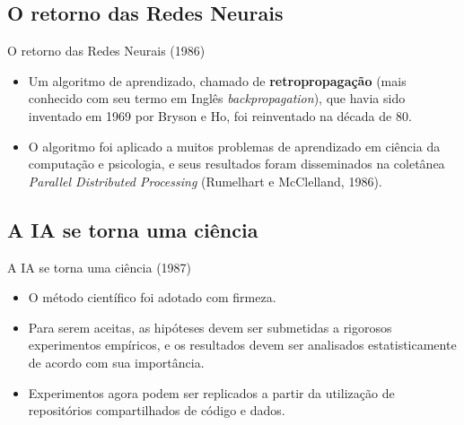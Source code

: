 \documentclass{libs/ufc_format}
\begin{document}
\subsection{O retorno das Redes Neurais}

\begin{frame}{O retorno das Redes Neurais (1986)}
    \begin{itemize}
        \justifying
        \item Um algoritmo de aprendizado, chamado de \textbf{retropropagação} (mais conhecido com seu termo em Inglês \textit{backpropagation}), que havia sido inventado em 1969 por Bryson e Ho, foi reinventado na década de 80.
        \item<2> O algoritmo foi aplicado a muitos problemas de aprendizado em ciência da computação e psicologia, e seus resultados foram disseminados na coletânea \textit{Parallel Distributed Processing} (Rumelhart e McClelland, 1986).
    \end{itemize}
\end{frame}

\subsection{A IA se torna uma ciência}

\begin{frame}{A IA se torna uma ciência (1987)}
    \begin{itemize}
        \justifying
        \item O método científico foi adotado com firmeza.
        \item Para serem aceitas, as hipóteses devem ser submetidas a rigorosos experimentos empíricos, e os resultados devem ser analisados estatisticamente de acordo com sua importância.
        \item Experimentos agora podem ser replicados a partir da utilização de repositórios compartilhados de código e dados.
    \end{itemize}
\end{frame}

\end{document}
